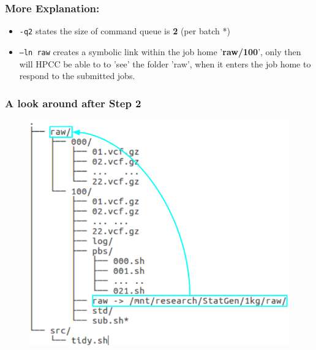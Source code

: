\documentclass{beamer}
\begin{document}
\begin{frame}
\frametitle{More Explanation:}
\begin{itemize}
\item \texttt{-q2} states the size of command queue is \textbf{2} (per batch *)
\item \texttt{--ln raw} creates a symbolic link within the job home '\textbf{raw/100}', only then will HPCC be
able to to 'see' the folder 'raw', when it enters the job home to respond to the submitted jobs.
\end{itemize}
\end{frame}


\begin{frame}[fragile]
\frametitle{A look around after Step 2}
\begin{figure}
\includegraphics[width=0.6\linewidth]{img/step2_ln}
\end{figure}
\end{frame}
\end{document}
